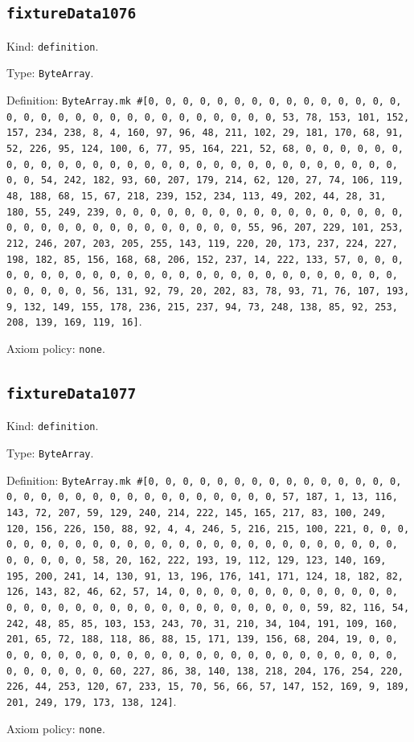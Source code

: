\documentclass[11pt]{article}
\begin{document}
\subsection*{\texttt{fixtureData1076}}
\noindent Kind: \texttt{definition}.\par
\noindent Type: \texttt{ByteArray}.\par
\noindent Definition: \texttt{ByteArray.mk \#[0, 0, 0, 0, 0, 0, 0, 0, 0, 0, 0, 0, 0, 0, 0, 0, 0, 0, 0, 0, 0, 0, 0, 0, 0, 0, 0, 0, 0, 0, 0, 53, 78, 153, 101, 152, 157, 234, 238, 8, 4, 160, 97, 96, 48, 211, 102, 29, 181, 170, 68, 91, 52, 226, 95, 124, 100, 6, 77, 95, 164, 221, 52, 68, 0, 0, 0, 0, 0, 0, 0, 0, 0, 0, 0, 0, 0, 0, 0, 0, 0, 0, 0, 0, 0, 0, 0, 0, 0, 0, 0, 0, 0, 0, 0, 54, 242, 182, 93, 60, 207, 179, 214, 62, 120, 27, 74, 106, 119, 48, 188, 68, 15, 67, 218, 239, 152, 234, 113, 49, 202, 44, 28, 31, 180, 55, 249, 239, 0, 0, 0, 0, 0, 0, 0, 0, 0, 0, 0, 0, 0, 0, 0, 0, 0, 0, 0, 0, 0, 0, 0, 0, 0, 0, 0, 0, 0, 0, 0, 55, 96, 207, 229, 101, 253, 212, 246, 207, 203, 205, 255, 143, 119, 220, 20, 173, 237, 224, 227, 198, 182, 85, 156, 168, 68, 206, 152, 237, 14, 222, 133, 57, 0, 0, 0, 0, 0, 0, 0, 0, 0, 0, 0, 0, 0, 0, 0, 0, 0, 0, 0, 0, 0, 0, 0, 0, 0, 0, 0, 0, 0, 0, 0, 56, 131, 92, 79, 20, 202, 83, 78, 93, 71, 76, 107, 193, 9, 132, 149, 155, 178, 236, 215, 237, 94, 73, 248, 138, 85, 92, 253, 208, 139, 169, 119, 16]}.\par
\noindent Axiom policy: \texttt{none}.\par
\subsection*{\texttt{fixtureData1077}}
\noindent Kind: \texttt{definition}.\par
\noindent Type: \texttt{ByteArray}.\par
\noindent Definition: \texttt{ByteArray.mk \#[0, 0, 0, 0, 0, 0, 0, 0, 0, 0, 0, 0, 0, 0, 0, 0, 0, 0, 0, 0, 0, 0, 0, 0, 0, 0, 0, 0, 0, 0, 0, 57, 187, 1, 13, 116, 143, 72, 207, 59, 129, 240, 214, 222, 145, 165, 217, 83, 100, 249, 120, 156, 226, 150, 88, 92, 4, 4, 246, 5, 216, 215, 100, 221, 0, 0, 0, 0, 0, 0, 0, 0, 0, 0, 0, 0, 0, 0, 0, 0, 0, 0, 0, 0, 0, 0, 0, 0, 0, 0, 0, 0, 0, 0, 0, 58, 20, 162, 222, 193, 19, 112, 129, 123, 140, 169, 195, 200, 241, 14, 130, 91, 13, 196, 176, 141, 171, 124, 18, 182, 82, 126, 143, 82, 46, 62, 57, 14, 0, 0, 0, 0, 0, 0, 0, 0, 0, 0, 0, 0, 0, 0, 0, 0, 0, 0, 0, 0, 0, 0, 0, 0, 0, 0, 0, 0, 0, 0, 0, 59, 82, 116, 54, 242, 48, 85, 85, 103, 153, 243, 70, 31, 210, 34, 104, 191, 109, 160, 201, 65, 72, 188, 118, 86, 88, 15, 171, 139, 156, 68, 204, 19, 0, 0, 0, 0, 0, 0, 0, 0, 0, 0, 0, 0, 0, 0, 0, 0, 0, 0, 0, 0, 0, 0, 0, 0, 0, 0, 0, 0, 0, 0, 0, 60, 227, 86, 38, 140, 138, 218, 204, 176, 254, 220, 226, 44, 253, 120, 67, 233, 15, 70, 56, 66, 57, 147, 152, 169, 9, 189, 201, 249, 179, 173, 138, 124]}.\par
\noindent Axiom policy: \texttt{none}.\par
\end{document}
